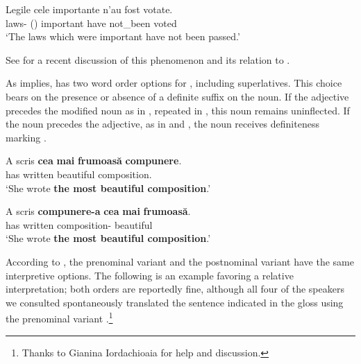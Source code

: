 \documentclass[output=paper
,modfonts
,nonflat]{langsci/langscibook}
\begin{document}
\ea \label{ex:coppockstrand:31}
\gll Legile {\op}cele{\cp} importante n'au fost votate.\\
laws- () important have not\_been voted\\
\glt `The laws which were important have not been passed.'
\z

See \citet[53--62]{Alexiadou2014} for a recent discussion of this phenomenon and its relation to  .

As  implies,
 has two word order options for , including superlatives. This choice bears on the presence or absence of a definite suffix on the noun. If the adjective precedes the modified noun as in , repeated in , this noun remains uninflected. If the noun precedes the adjective, as in  and , the noun receives definiteness marking \citep[53]{Cojocaru2003}.

\ea \label{ex:coppockstrand:32}
\begin{xlist}
\ex \label{ex:coppockstrand:32a}
\gll A scris \textbf{cea} \textbf{mai} \textbf{frumoasă} \textbf{compunere}.\\
has written  \cmpr{} beautiful composition.\acc\\
\glt `She wrote \textbf{the most beautiful composition}.'

\ex \label{ex:coppockstrand:32b}
\gll A scris \textbf{compunere-a} \textbf{cea} \textbf{mai} \textbf{frumoasă}.\\
has written composition-  \cmpr{} beautiful\\
\glt `She wrote \textbf{the most beautiful composition}.'
\end{xlist}
\z

According to \citet{Teodorescu2007}, the prenominal variant  and the postnominal variant  have the same interpretive options. The following is an example favoring a relative interpretation; both orders are reportedly fine, although all four of the  speakers we consulted spontaneously translated the sentence indicated in the  gloss using the prenominal variant .\footnote{Thanks to Gianina Iordachioaia for help and discussion.}
\end{document}

